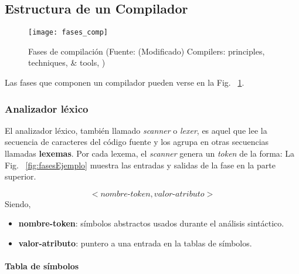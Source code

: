 


\subsection{Estructura de un Compilador}

    \label{estructuraCompiladores}

    \begin{figure}[t]
        \begingroup
            \centering
                \texttt{[image: fases\_comp]}
                \caption{Fases de compilación (Fuente: (Modificado) Compilers: principles, techniques, \& tools, \cite{aho_compilers:_2007}) }
                \label{fig:fasesComp}
            \par
        \endgroup

    \end{figure}

    Las fases que componen un compilador \cite{aho_compilers:_2007} pueden verse en la Fig. ~\ref{fig:fasesComp}.

\subsubsection{Analizador léxico}

    El analizador léxico, también llamado \emph{scanner} o \emph{lexer}, es aquel que lee la secuencia de caracteres del código fuente y los agrupa en
    otras secuencias llamadas \textbf{lexemas}. Por cada lexema, el \emph{scanner} genera un \emph{token} de la forma:
    La Fig. ~\ref{fig:fasesEjemplo} muestra las entradas y salidas de la fase en la parte superior.

    \begin{equation}
    \label{eq:1}
    <nombre\text{-}token, valor\text{-}atributo>
    \end{equation}
    Siendo, 
    \begin{itemize}
        \item \textbf{nombre-token}: símbolos abstractos usados durante el análisis sintáctico.
        \item \textbf{valor-atributo}: puntero a una entrada en la tablas de símbolos.
    \end{itemize}

    \paragraph*{Tabla de símbolos}


